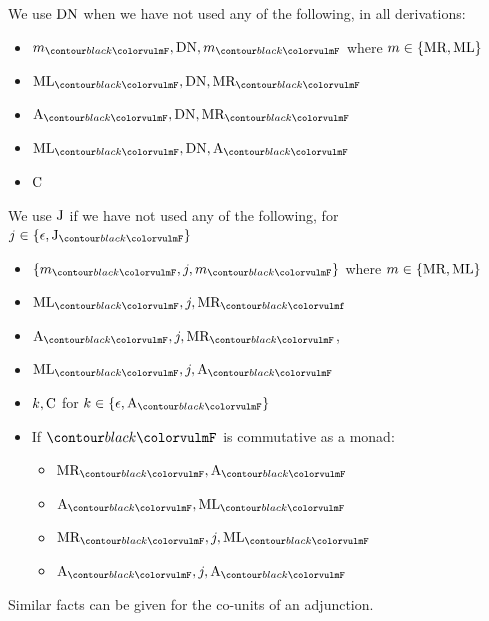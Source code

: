\noindent We use $\text{DN}$ when we have not used any of the following, in all
derivations:
\begin{multicols}{2}
	\begin{itemize}
		\item $m_{\f{F}}, \combDN, m_{\f{F}}$ where
		      $m \in \{\text{MR}, \text{ML}\}$
		\item $\combML_{\f{F}}, \combDN, \combMR_{\f{F}}$
		\item $\combA_{\f{F}}, \combDN, \combMR_{\f{F}}$
		\item $\combML_{\f{F}}, \combDN, \combA_{\f{F}}$
		\item $\text{C}$
	\end{itemize}
\end{multicols}
\noindent We use $\text{J}$ if we have not used any of the following,
for $j \in \{\epsilon, \combJ_{\f{F}}\}$
\begin{multicols}{2}
	\begin{itemize}
		\item $\left\{m_{\f{F}}, j, m_{\f{F}}\right\}$ where
		      $m \in \{\text{MR}, \text{ML}\}$
		\item $\combML_{\f{F}}, j, \combMR_{\f{f}}$
		\item $\combA_{\f{F}}, j, \combMR_{\f{F}}$,
		\item $\combML_{\f{F}}, j, \combA_{\f{F}}$
		\item $k, \text{C}$ for $k \in \{\epsilon, \combA_{\f{F}}\}$
		\item If $\f{F}$ is commutative as a monad:
		      \begin{itemize}
			      \item $\combMR_{\f{F}}, \combA_{\f{F}}$
			      \item $\combA_{\f{F}}, \combML_{\f{F}}$
			      \item $\combMR_{\f{F}}, j, \combML_{\f{F}}$
			      \item $\combA_{\f{F}}, j, \combA_{\f{F}}$
		      \end{itemize}
	\end{itemize}
\end{multicols}
Similar facts can be given for the co-units of an adjunction.

